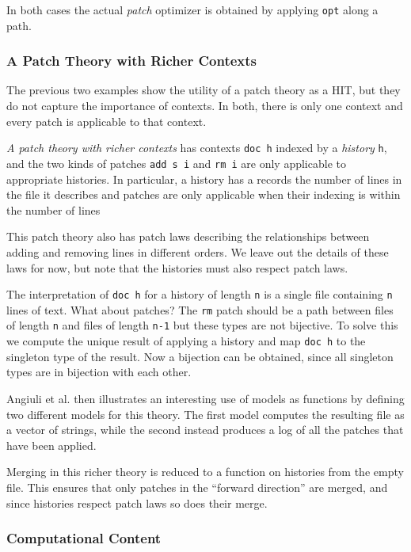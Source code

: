 In both cases the actual \emph{patch} optimizer is obtained by applying
\texttt{opt} along a path.

\subsubsection{A Patch Theory with Richer Contexts} 

The previous two examples show the utility of a patch theory as a HIT,
but they do not capture the importance of contexts. In both, there is only one
context and every patch is applicable to that context.

\emph{A patch theory with richer contexts} has contexts \texttt{doc h} indexed by a
\emph{history} \texttt{h}, and the two kinds of patches \texttt{add s i} and
\texttt{rm i} are only applicable to appropriate histories. In particular, a
history has a records the number of lines in the file it describes and patches
are only applicable when their indexing is within the number of lines

This patch theory also has patch laws describing the relationships between
adding and removing lines in different orders. We leave out the details of these
laws for now, but note that the histories must also respect patch laws.

The interpretation of \texttt{doc h} for a history of length \texttt{n} is a
single file containing \texttt{n} lines of text. What about patches? The
\texttt{rm} patch should be a path between files of length \texttt{n} and files
of length \texttt{n-1} but these types are not bijective. To solve this we
compute the unique result of applying a history and map \texttt{doc h} to the
singleton type of the result. Now a bijection can be obtained, since all
singleton types are in bijection with each other.

Angiuli et al. then illustrates an interesting use of models as functions by
defining two different models for this theory. The first model computes the
resulting file as a vector of strings, while the second instead produces a log
of all the patches that have been applied.

Merging in this richer theory is reduced to a function on histories from the
empty file. This ensures that only patches in the ``forward direction'' are
merged, and since histories respect patch laws so does their merge.

\subsubsection{Computational Content}

